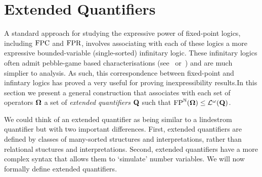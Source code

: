\documentclass[../main/thesis.tex]{subfiles}
\begin{document}


\section{Extended Quantifiers}
A standard approach for studying the expressive power of fixed-point logics,
including $\text{\upshape FPC}$ and $\text{\upshape FPR}$, involves associating with each of these logics a
more expressive bounded-variable (single-sorted) infinitary logic. These
infinitary logics often admit pebble-game based characterisations (see~\cite{}
or~\cite{}) and are much simplier to analysis. As such, this correspondence
between fixed-point and infintary logics has proved a very useful for proving
inexpressibility results.In this section we present a general construction that
associates with each set of operators $\mathbf{\mathbf{\Omega}}$ a set of \emph{extended
  quantifiers} $\mathbf{Q}$ such that $\text{\upshape FP}^{\mathbb{N}}(\mathbf{\mathbf{\Omega}}) \leq
\mathcal{L}^{\omega}(\mathbf{Q})$.

We could think of an extended quantifier as being similar to a lindestrom
quantifier but with two important differences. First, extended quantifiers are
defined by classes of many-sorted structures and interpretations, rather than
relational stuctures and interpretations. Second, extended quantifiers have a
more complex syntax that allows them to `simulate' number variables. We will now
formally define extended quantifiers.









\end{document}
